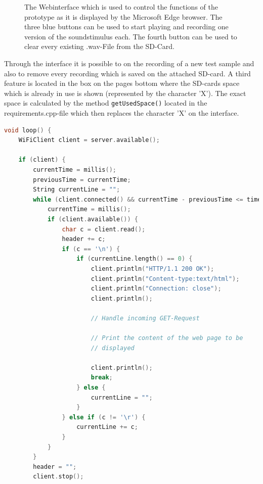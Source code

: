 \begin{figure}
	\caption{The Webinterface which is used to control the functions of the prototype as it is displayed by the Microsoft Edge browser. The three blue buttons can be used to start playing and recording one version of the soundstimulus each. The fourth button can be used to clear every existing .wav-File from the SD-Card.}
	\label{fig:webinterface}
\end{figure}

Through the interface it is possible to on the recording of a new test sample and also to remove every recording which is saved on the attached SD-card.
A third feature is located in the box on the pages bottom where the SD-cards space which is already in use is shown (represented by the character 'X').
The exact space is calculated by the method \texttt{getUsedSpace()} located in the requirements.cpp-file which then replaces the character 'X' on the interface. 
\begin{lstlisting}[frame=single, language={c++}, style=style,
	caption={The part of the loop-function which is used to manage the connection of a socket hosted on the microcontroller to a web-client.}, label={lst:WiFiCon},float=!htb]
void loop() {
	WiFiClient client = server.available();
	
	if (client) {
		currentTime = millis();
		previousTime = currentTime;
		String currentLine = "";
		while (client.connected() && currentTime - previousTime <= timeoutTime) {
			currentTime = millis();
			if (client.available()) {
				char c = client.read();
				header += c;
				if (c == '\n') {
					if (currentLine.length() == 0) {
						client.println("HTTP/1.1 200 OK");
						client.println("Content-type:text/html");
						client.println("Connection: close");
						client.println();
						
						// Handle incoming GET-Request
						
						// Print the content of the web page to be
						// displayed
						
						client.println();
						break;
					} else {
						currentLine = "";
					}
				} else if (c != '\r') {
					currentLine += c;
				}
			}
		}
		header = "";
		client.stop();
\end{lstlisting}

